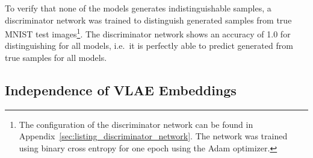 To verify that none of the models generates indistinguishable samples, a discriminator network was trained to distinguish generated samples from true \textsc{MNIST} test images\footnote{The configuration of the discriminator network can be found in Appendix~\ref{sec:listing_discriminator_network}. The network was trained using binary cross entropy for one epoch using the Adam optimizer.}.
The discriminator network shows an accuracy of 1.0 for distinguishing for all models, i.e.~it is perfectly able to predict generated from true samples for all models.

\subsection{Independence of VLAE Embeddings}\label{subsec:independence-of-vlae-embeddings}

